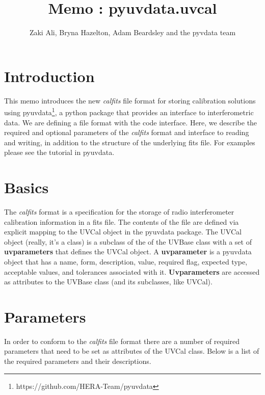 \documentclass[11pt, oneside]{article}   	%
\title{Memo : pyuvdata.uvcal}
\author{Zaki Ali, Bryna Hazelton, Adam Beardsley and the pyvdata team}
\begin{document}
\maketitle
\section{Introduction}
This memo introduces the new \textit{calfits} file format for storing calibration solutions using pyuvdata\footnote{https://github.com/HERA-Team/pyuvdata}, a python package that provides an interface to interferometric data. We are defining a file format with the code interface. Here, we describe the required and optional parameters of the \textit{calfits} format and interface to reading and writing, in addition to the structure of the underlying fits file. For examples please see the tutorial in pyuvdata.

\section{Basics}

The \textit{calfits} format is a specification for the storage of radio interferometer calibration information in a fits file.  The contents of the file are defined via explicit mapping to the UVCal object in the pyuvdata package.
The UVCal object (really, it's a class) is a subclass of the of the UVBase class with a set of \textbf{uvparameters} that defines the UVCal object. A \textbf{uvparameter} is a pyuvdata object that has a name, form, description, value, required flag, expected type, acceptable values, and tolerances associated with it.  \textbf{Uvparameters} are accessed as attributes to the UVBase class (and its subclasses, like UVCal). 

\section{Parameters}
In order to conform to the \textit{calfits} file format there are a number of required parameters that need to be set as attributes of the UVCal class. Below is a list of the required parameters and their descriptions.
\end{document}
